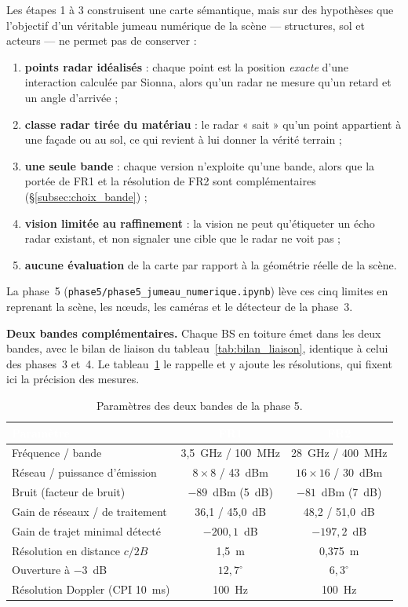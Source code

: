 \documentclass[12pt,a4paper,titlepage]{article}
\newcommand{\hd}[1]{\textcolor{white}{\textbf{#1}}}
\begin{document}
Les étapes 1 à 3 construisent une carte sémantique, mais sur des hypothèses que l'objectif d'un véritable jumeau numérique de la scène --- structures, sol et acteurs --- ne permet pas de conserver :
\begin{enumerate}[leftmargin=1.5em]
    \item \textbf{points radar idéalisés} : chaque point est la position \emph{exacte} d'une interaction calculée par Sionna, alors qu'un radar ne mesure qu'un retard et un angle d'arrivée ;
    \item \textbf{classe radar tirée du matériau} : le radar « sait » qu'un point appartient à une façade ou au sol, ce qui revient à lui donner la vérité terrain ;
    \item \textbf{une seule bande} : chaque version n'exploite qu'une bande, alors que la portée de FR1 et la résolution de FR2 sont complémentaires (\S\ref{subsec:choix_bande}) ;
    \item \textbf{vision limitée au raffinement} : la vision ne peut qu'étiqueter un écho radar existant, et non signaler une cible que le radar ne voit pas ;
    \item \textbf{aucune évaluation} de la carte par rapport à la géométrie réelle de la scène.
\end{enumerate}
La phase~5 (\texttt{phase5/phase5\_jumeau\_numerique.ipynb}) lève ces cinq limites en reprenant la scène, les n\oe uds, les caméras et le détecteur de la phase~3.

\textbf{Deux bandes complémentaires.} Chaque BS en toiture émet dans les deux bandes, avec le bilan de liaison du tableau~\ref{tab:bilan_liaison}, identique à celui des phases~3 et~4. Le tableau~\ref{tab:bandes_phase5} le rappelle et y ajoute les résolutions, qui fixent ici la précision des mesures.

\begin{table}[H]
    \centering
    \caption{Paramètres des deux bandes de la phase 5.}
    \label{tab:bandes_phase5}
    \begin{tabular}{lcc}
        \toprule
        \rowcolor{tabhead}
        \hd{Paramètre} & \hd{FR1} & \hd{FR2} \\
        \midrule
        Fréquence / bande & 3,5~GHz / 100~MHz & 28~GHz / 400~MHz \\
        Réseau / puissance d'émission & $8\times8$ / 43~dBm & $16\times16$ / 30~dBm \\
        Bruit (facteur de bruit) & $-89$~dBm (5~dB) & $-81$~dBm (7~dB) \\
        Gain de réseaux / de traitement & 36,1 / 45,0~dB & 48,2 / 51,0~dB \\
        Gain de trajet minimal détecté & $-200{,}1$~dB & $-197{,}2$~dB \\
        Résolution en distance $c/2B$ & 1,5~m & 0,375~m \\
        Ouverture à $-3$~dB & $12{,}7^\circ$ & $6{,}3^\circ$ \\
        Résolution Doppler (CPI 10~ms) & 100~Hz & 100~Hz \\
        \bottomrule
    \end{tabular}
\end{table}
\end{document}
